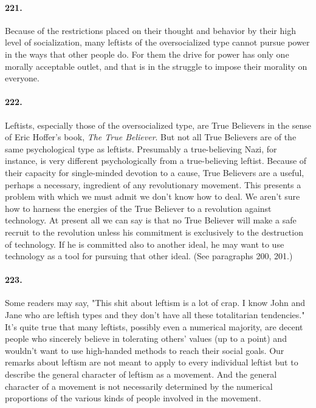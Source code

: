 \documentclass[12pt]{book}
\begin{document}
\paragraph{221.}  Because of the restrictions placed on their thought and behavior by their high level of socialization, many leftists of the oversocialized type cannot pursue power in the ways that other people do. For them the drive for power has only one morally acceptable outlet, and that is in the struggle to impose their morality on everyone.


\paragraph{222.} Leftists, especially those of the oversocialized type, are True Believers in the sense of Eric Hoffer's book, \emph{The True Believer}. But not all True Believers are of the same psychological type as leftists. Presumably a true-believing Nazi, for instance, is very different psychologically from a true-believing leftist. Because of their capacity for single-minded devotion to a cause, True Believers are a useful, perhaps a necessary, ingredient of any revolutionary movement. This presents a problem with which we must admit we don't know how to deal. We aren't sure how to harness the energies of the True Believer to a revolution against technology. At present all we can say is that no True Believer will make a safe recruit to the revolution unless his commitment is exclusively to the destruction of technology. If he is committed also to another ideal, he may want to use technology as a tool for pursuing that other ideal. (See paragraphs 200, 201.)


\paragraph{223.} Some readers may say, "This shit about leftism is a lot of crap.  I know John and Jane who are leftish types and they don't have all these totalitarian tendencies." It's quite true that many leftists, possibly even a numerical majority, are decent people who sincerely believe in tolerating others' values (up to a point) and wouldn't want to use high-handed methods to reach their social goals. Our remarks about leftism are not meant to apply to every individual leftist but to describe the general character of leftism as a movement. And the general character of a movement is not necessarily determined by the numerical proportions of the various kinds of people involved in the movement.
\end{document}
